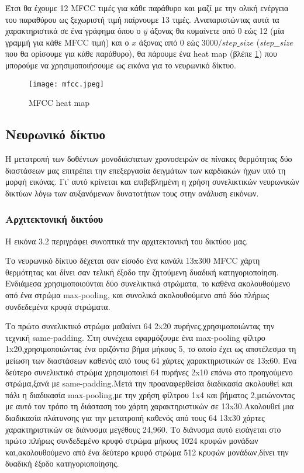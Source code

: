 Έτσι θα έχουμε 12 MFCC τιμές για κάθε παράθυρο και μαζί με την ολική ενέργεια
του παραθύρου ως ξεχωριστή τιμή παίρνουμε 13 τιμές. Αναπαριστώντας αυτά τα
χαρακτηριστικά σε ένα γράφημα όπου ο $y$ άξονας θα κυμαίνετε από 0 εώς 12 (μία
γραμμή για κάθε MFCC τιμή) και ο $x$ άξονας από 0 εώς $3000 / step\_size$
(\emph{step\_size} που θα ορίσουμε για κάθε παράθυρο), θα πάρουμε ένα heat map
(βλέπε \ref{mfcc}) που μπορούμε να χρησιμοποιήσουμε ως εικόνα για το νευρωνικό
δίκτυο.

\begin{figure}[H]
	\center
	\texttt{[image: mfcc.jpeg]}
	\caption{MFCC heat map \cite{fayek2016}}
	\label{mfcc}
\end{figure}

\subsection{Νευρωνικό δίκτυο}

Η μετατροπή των δοθέντων μονοδιάστατων χρονοσειρών σε πίνακες θερμότητας δύο διαστάσεων 
μας επιτρέπει την επεξεργασία δειγμάτων των καρδιακών ήχων υπό τη μορφή εικόνας. Γι' αυτό
 κρίνεται και επιβεβλημένη η χρήση συνελικτικών νευρωνικών δικτύων λόγω των αυξανόμενων
  δυνατοτήτων τους στην ανάλυση εικόνων.
\subsubsection{Αρχιτεκτονική δικτύου}

Η εικόνα 3.2 περιγράφει συνοπτικά την αρχιτεκτονική του δικτύου μας. 



Το νευρωνικό δίκτυο δέχεται σαν είσοδο ένα κανάλι 13x300 MFCC χάρτη θερμότητας και δίνει
σαν τελική έξοδο την ζητούμενη δυαδική κατηγοριοποίηση. Ενδιάμεσα χρησιμοποιούνται δύο 
συνελικτικά στρώματα, το καθένα ακολουθούμενο από ένα στρώμα max-pooling, 
και συνολικά ακολουθούμενο από δύο πλήρως συνδεδεμένα κρυφά στρώματα. \par

Το πρώτο συνελικτικό στρώμα μαθαίνει 64 2x20 πυρήνες,χρησιμοποιώντας την τεχνική same-padding.
 Στη συνέχεια εφαρμόζουμε ένα max-pooling φίλτρο 1x20,χρησιμοποιώντας ένα οριζόντιο βήμα μήκους 5,
 το οποίο έχει ως αποτέλεσμα τη μείωση των διαστάσεων καθενός από τους 64 χάρτες χαρακτηριστικών
 σε 13x60. Ένα δεύτερο συνελικτικό στρώμα χρησιμοποιεί 64 πυρήνες 2x10 επάνω στο προηγούμενο 
 στρώμα,ξανά με same-padding.Μετά την προαναφερθείσα διαδικασία ακολουθεί και πάλι η διαδικασία 
 max-pooling,με την χρήση φίλτρου 1x4 και βήματος 2,μειώνοντας με αυτό τον τρόπο τη διάσταση του 
 χάρτη χαρακτηριστικών σε 13x30.Ακολουθεί μια διαδικασία πλάτυνσης για την μετατροπή καθενός από 
 τους 64 13x30 χάρτες χαρακτηριστικών σε διάνυσμα μεγέθους 24,960. Το διάνυσμα αυτό εισάγεται στο 
πρώτο πλήρως συνδεδεμένο κρυφό στρώμα μήκους 1024 κρυφών μονάδων και,ακολουθούμενο από ένα δεύτερο 
κρυφό στρώμα 512 κρυφών μονάδων,δίνει την δυαδική έξοδο κατηγοριοποίησης. \par










